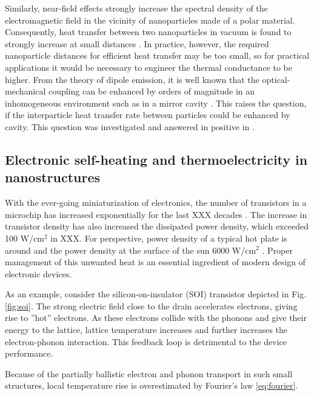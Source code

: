 Similarly, near-field effects strongly increase the spectral density of the electromagnetic field in the vicinity of nanoparticles made of a polar material. Consequently, heat transfer between two nanoparticles in vacuum is found to strongly increase at small distances \cite{domingues05}. In practice, however, the required nanoparticle distances for efficient heat transfer may be too small, so for practical applications it would be necessary to engineer the thermal conductance to be higher. From the theory of dipole emission, it is well known that the optical-mechanical coupling can be enhanced by orders of magnitude in an inhomogeneous environment such as in a mirror cavity \cite{novotny}. This raises the question, if the interparticle heat transfer rate between particles could be enhanced by cavity. This question was investigated and answered in positive in .


\subsection{Electronic self-heating and thermoelectricity in nanostructures}
\label{sec:intro_electrons}

With the ever-going miniaturization of electronics, the number of transistors in a microchip has increased exponentially for the last XXX decades \cite{}. The increase in transistor density has also increased the dissipated power density, which exceeded 100 W/cm$^2$ in XXX. For perspective, power density of a typical hot plate is around and the power density at the surface of the sun 6000 W/cm$^2$ \cite{}. Proper management of this unwanted heat is an essential ingredient of modern design of electronic devices.

As an example, consider the silicon-on-insulator (SOI) transistor depicted in Fig. \ref{fig:soi}. The strong electric field close to the drain \cite{} accelerates electrons, giving rise to ''hot'' electrons. As these electrons collide with the phonons and give their energy to the lattice, lattice temperature increases and further increases the electron-phonon interaction. This feedback loop is detrimental to the device performance. 


Because of the partially ballistic electron and phonon transport in such small structures, local temperature rise is overestimated by Fourier's law \eqref{eq:fourier}. 

